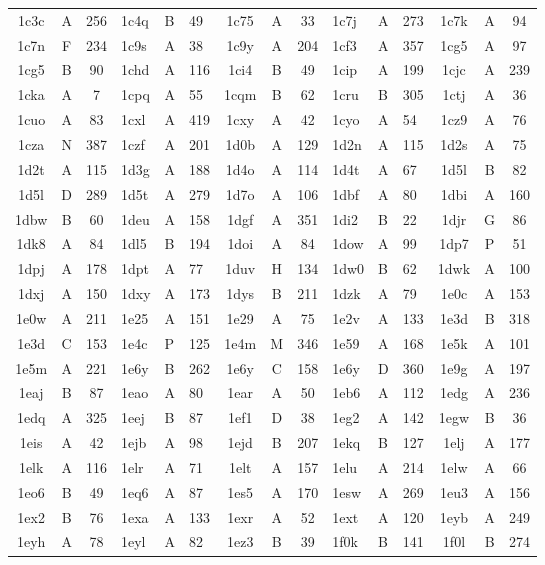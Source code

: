 \begin{longtable}{|c|c|c| a|a|a| c|c|c| a|a|a| c|c|c|}
1c3c & A & 256 & 1c4q & B & 49 & 1c75 & A & 33 & 1c7j & A & 273 & 1c7k & A & 94\\
1c7n & F & 234 & 1c9s & A & 38 & 1c9y & A & 204 & 1cf3 & A & 357 & 1cg5 & A & 97\\
1cg5 & B & 90 & 1chd & A & 116 & 1ci4 & B & 49 & 1cip & A & 199 & 1cjc & A & 239\\
1cka & A & 7 & 1cpq & A & 55 & 1cqm & B & 62 & 1cru & B & 305 & 1ctj & A & 36\\
1cuo & A & 83 & 1cxl & A & 419 & 1cxy & A & 42 & 1cyo & A & 54 & 1cz9 & A & 76\\
1cza & N & 387 & 1czf & A & 201 & 1d0b & A & 129 & 1d2n & A & 115 & 1d2s & A & 75\\
1d2t & A & 115 & 1d3g & A & 188 & 1d4o & A & 114 & 1d4t & A & 67 & 1d5l & B & 82\\
1d5l & D & 289 & 1d5t & A & 279 & 1d7o & A & 106 & 1dbf & A & 80 & 1dbi & A & 160\\
1dbw & B & 60 & 1deu & A & 158 & 1dgf & A & 351 & 1di2 & B & 22 & 1djr & G & 86\\
1dk8 & A & 84 & 1dl5 & B & 194 & 1doi & A & 84 & 1dow & A & 99 & 1dp7 & P & 51\\
1dpj & A & 178 & 1dpt & A & 77 & 1duv & H & 134 & 1dw0 & B & 62 & 1dwk & A & 100\\
1dxj & A & 150 & 1dxy & A & 173 & 1dys & B & 211 & 1dzk & A & 79 & 1e0c & A & 153\\
1e0w & A & 211 & 1e25 & A & 151 & 1e29 & A & 75 & 1e2v & A & 133 & 1e3d & B & 318\\
1e3d & C & 153 & 1e4c & P & 125 & 1e4m & M & 346 & 1e59 & A & 168 & 1e5k & A & 101\\
1e5m & A & 221 & 1e6y & B & 262 & 1e6y & C & 158 & 1e6y & D & 360 & 1e9g & A & 197\\
1eaj & B & 87 & 1eao & A & 80 & 1ear & A & 50 & 1eb6 & A & 112 & 1edg & A & 236\\
1edq & A & 325 & 1eej & B & 87 & 1ef1 & D & 38 & 1eg2 & A & 142 & 1egw & B & 36\\
1eis & A & 42 & 1ejb & A & 98 & 1ejd & B & 207 & 1ekq & B & 127 & 1elj & A & 177\\
1elk & A & 116 & 1elr & A & 71 & 1elt & A & 157 & 1elu & A & 214 & 1elw & A & 66\\
1eo6 & B & 49 & 1eq6 & A & 87 & 1es5 & A & 170 & 1esw & A & 269 & 1eu3 & A & 156\\
1ex2 & B & 76 & 1exa & A & 133 & 1exr & A & 52 & 1ext & A & 120 & 1eyb & A & 249\\
1eyh & A & 78 & 1eyl & A & 82 & 1ez3 & B & 39 & 1f0k & B & 141 & 1f0l & B & 274\\

\end{longtable}
